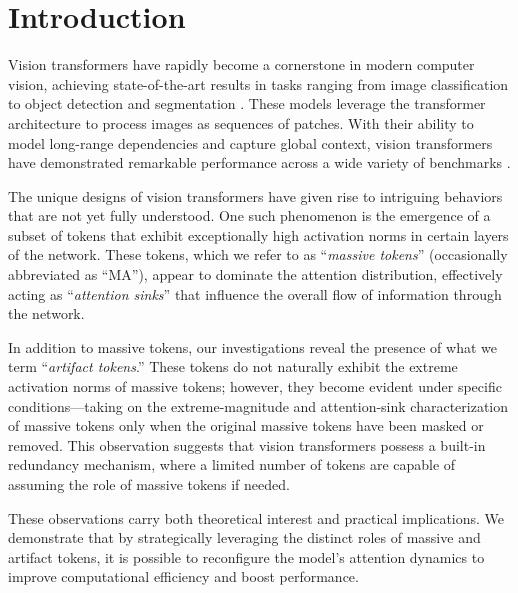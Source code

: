 \section{Introduction}
\label{sec:intro}

Vision transformers have rapidly become a cornerstone in modern computer vision, achieving state-of-the-art results in tasks ranging from image classification to object detection and segmentation \cite{he2022masked} \cite{oquab2023dinov2} \cite{radford2021clip} \cite{touvron2022deitiii}. These models leverage the transformer architecture to process images as sequences of patches. With their ability to model long-range dependencies and capture global context, vision transformers \cite{dosovitskiy2021vit} have demonstrated remarkable performance across a wide variety of benchmarks \cite{chen2015coco} \cite{deng2009imagenet} \cite{pascal-voc-2012} \cite{young2014flickr} \cite{zhou2017ade}.

The unique designs of vision transformers have given rise to intriguing behaviors that are not yet fully understood. One such phenomenon is the emergence of a subset of tokens that exhibit exceptionally high activation norms in certain layers of the network. These tokens, which we refer to as ``\textit{massive tokens}'' (occasionally abbreviated as ``MA''), appear to dominate the attention distribution, effectively acting as ``\textit{attention sinks}'' \cite{gu2024attnsink} that influence the overall flow of information through the network.

In addition to massive tokens, our investigations reveal the presence of what we term ``\textit{artifact tokens}.'' These tokens do not naturally exhibit the extreme activation norms of massive tokens; however, they become evident under specific conditions---taking on the extreme-magnitude and attention-sink characterization of massive tokens only when the original massive tokens have been masked or removed. This observation suggests that vision transformers possess a built-in redundancy mechanism, where a limited number of tokens are capable of assuming the role of massive tokens if needed. 

These observations carry both theoretical interest and practical implications. We demonstrate that by strategically leveraging the distinct roles of massive and artifact tokens, it is possible to reconfigure the model’s attention dynamics to improve computational efficiency and boost performance.

